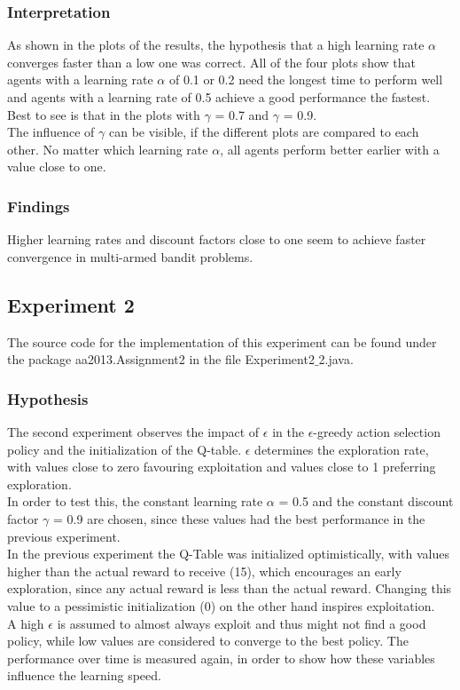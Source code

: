 \documentclass[11pt]{article}
\begin{document}
\subsubsection{Interpretation}
As shown in the plots of the results, the hypothesis that a high learning rate $\alpha$ converges faster than a low one was correct. All of the four plots show that agents with a learning rate $\alpha$ of 0.1 or 0.2 need the longest time to perform well and agents with a learning rate of 0.5 achieve a good performance the fastest. Best to see is that in the plots with $\gamma$ = 0.7 and $\gamma$ = 0.9.\\
The influence of $\gamma$ can be visible, if the different plots are compared to each other. No matter which learning rate $\alpha$, all agents perform better earlier with a value close to one.

\subsubsection{Findings}
Higher learning rates and discount factors close to one seem to achieve faster convergence in multi-armed bandit problems.


\subsection{Experiment 2}
The source code for the implementation of this experiment can be found under the package aa2013.Assignment2 in the file Experiment2$\_$2.java.
\subsubsection{Hypothesis}
The second experiment observes the impact of $\epsilon$ in the $\epsilon$-greedy action selection policy and the initialization of the Q-table. $\epsilon$ determines the exploration rate, with values close to zero favouring exploitation and values close to 1 preferring exploration.\\
In order to test this, the constant learning rate $\alpha$ = 0.5 and the constant discount factor $\gamma$ = 0.9 are chosen, since these values had the best performance in the previous experiment.\\
In the previous experiment the Q-Table was initialized optimistically, with values higher than the actual reward to receive (15), which encourages an early exploration, since any actual reward is less than the actual reward. Changing this value to a pessimistic initialization (0) on the other hand inspires exploitation.\\
A high $\epsilon$ is assumed to almost always exploit and thus might not find a good policy, while low values are considered to converge to the best policy.
The performance over time is measured again, in order to show how these variables influence the learning speed.
\end{document}
